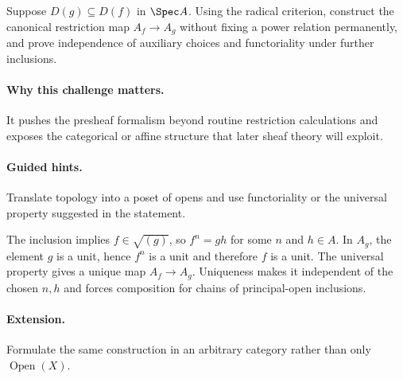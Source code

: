 \begin{problem}
Suppose $D(g)\subseteq D(f)$ in $\Spec A$.  Using the radical criterion, construct the canonical restriction map $A_f\to A_g$ without fixing a power relation permanently, and prove independence of auxiliary choices and functoriality under further inclusions.
\end{problem}

\paragraph{Why this challenge matters.}
It pushes the presheaf formalism beyond routine restriction calculations and exposes the
categorical or affine structure that later sheaf theory will exploit.

\paragraph{Guided hints.}
Translate topology into a poset of opens and use functoriality or the universal property
suggested in the statement.

\begin{solution}
The inclusion implies $f\in\sqrt{(g)}$, so $f^n=gh$ for some $n$ and $h\in A$.  In $A_g$, the element $g$ is a unit, hence $f^n$ is a unit and therefore $f$ is a unit.  The universal property gives a unique map $A_f\to A_g$.  Uniqueness makes it independent of the chosen $n,h$ and forces composition for chains of principal-open inclusions.
\end{solution}

\paragraph{Extension.}
Formulate the same construction in an arbitrary category rather than only
$\operatorname{Open}(X)$.
